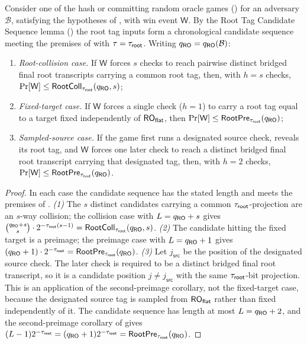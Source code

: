 \begin{lemma}
\label{lem:root-tag-hash}
Consider one of the hash or committing \TW{} random oracle games
() for an adversary $\mathcal{B}$, satisfying the
hypotheses of , with win event
$\mathsf{W}$. By the Root
Tag Candidate Sequence lemma
() the root tag inputs form a chronological
candidate sequence meeting the premises of  with
$\tau = \tau_{\mathsf{root}}$. Writing
$q_{\mathsf{RO}} = q_{\mathsf{RO}}(\mathcal{B})$:
\begin{enumerate}
\item \emph{Root-collision case.} If $\mathsf{W}$ forces $s$ checks to
  reach pairwise distinct bridged final root transcripts carrying a
  common root tag, then, with $h = s$ checks,
  $\Pr[\mathsf{W}] \leq \mathsf{RootColl}_{\tau_{\mathsf{root}}}(q_{\mathsf{RO}}, s)$;
\item \emph{Fixed-target case.} If $\mathsf{W}$ forces a single check
  ($h = 1$) to carry a root tag equal to a target fixed independently of
  $\mathsf{RO}_{\mathsf{flat}}$, then
  $\Pr[\mathsf{W}] \leq \mathsf{RootPre}_{\tau_{\mathsf{root}}}(q_{\mathsf{RO}})$;
\item \emph{Sampled-source case.} If the game first runs a designated
  source check, reveals its root tag, and $\mathsf{W}$ forces one later
  check to reach a distinct bridged final root transcript carrying that
  designated tag, then, with $h = 2$ checks,
  $\Pr[\mathsf{W}] \leq \mathsf{RootPre}_{\tau_{\mathsf{root}}}(q_{\mathsf{RO}})$.
\end{enumerate}
\end{lemma}

\begin{proof}
In each case the candidate sequence has the stated length and meets the
premises of .
\emph{(1)} The $s$ distinct candidates carrying a common
$\tau_{\mathsf{root}}$-projection are an $s$-way collision; the collision case with
$L = q_{\mathsf{RO}} + s$ gives
$\binom{q_{\mathsf{RO}} + s}{s} \cdot 2^{-\tau_{\mathsf{root}}(s-1)}
= \mathsf{RootColl}_{\tau_{\mathsf{root}}}(q_{\mathsf{RO}}, s)$.
\emph{(2)} The candidate hitting the fixed target is a preimage; the
preimage case with $L = q_{\mathsf{RO}} + 1$ gives
$(q_{\mathsf{RO}} + 1) \cdot 2^{-\tau_{\mathsf{root}}} = \mathsf{RootPre}_{\tau_{\mathsf{root}}}(q_{\mathsf{RO}})$.
\emph{(3)} Let $j_{\mathsf{src}}$ be the position of the designated
source check. The later check is required to be a distinct bridged final
root transcript, so it is a candidate position
$j \neq j_{\mathsf{src}}$ with the same
$\tau_{\mathsf{root}}$-bit projection. This is an application of the second-preimage
corollary, not the fixed-target case, because the designated source tag is
sampled from $\mathsf{RO}_{\mathsf{flat}}$ rather than fixed independently of it.
The candidate sequence has length at most $L = q_{\mathsf{RO}} + 2$, and the
second-preimage corollary of  gives
$(L-1)2^{-\tau_{\mathsf{root}}} = (q_{\mathsf{RO}}+1)2^{-\tau_{\mathsf{root}}}
= \mathsf{RootPre}_{\tau_{\mathsf{root}}}(q_{\mathsf{RO}})$.
\end{proof}

